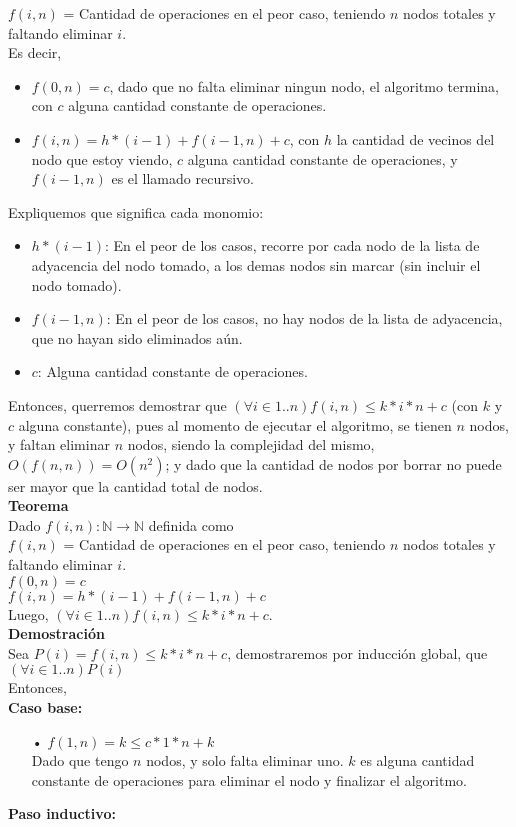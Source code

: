 $f(i,n)$ = Cantidad de operaciones en el peor caso, teniendo $n$ nodos totales y faltando eliminar $i$.\\
Es decir,\par
\begin{itemize}
	\item$f(0,n) = c$, dado que no falta eliminar ningun nodo, el algoritmo termina, con $c$ alguna cantidad constante de operaciones.\par
	\item $f(i,n) = h*(i-1) + f(i-1,n) + c$, con $h$ la cantidad de vecinos del nodo que estoy viendo, $c$ alguna cantidad constante de operaciones, y $f(i-1,n)$ es el llamado recursivo.\\
\end{itemize}
Expliquemos que significa cada monomio:
\begin{itemize}
	\item $h*(i-1)$: En el peor de los casos, recorre por cada nodo de la lista de adyacencia del nodo tomado, a los demas nodos sin marcar (sin incluir el nodo tomado).
	\item $f(i-1,n)$: En el peor de los casos, no hay nodos de la lista de adyacencia, que no hayan sido eliminados aún.
	\item $c$: Alguna cantidad constante de operaciones.
\end{itemize}
Entonces, querremos demostrar que $(\forall i \in {1..n}) f(i,n) \leq k*i*n + c$ (con $k$ y $c$ alguna constante), pues al momento de ejecutar el algoritmo, se tienen $n$ nodos, y faltan eliminar $n$ nodos, siendo la complejidad del mismo, $O(f(n,n)) = O(n^{2})$; y dado que la cantidad de nodos por borrar no puede ser mayor que la cantidad total de nodos.\\

\newpage
{\large\textbf{Teorema}}\\
Dado $f(i,n): \mathbb{N} \rightarrow \mathbb{N}$ definida como\\
$f(i,n)$ = Cantidad de operaciones  en el peor caso, teniendo $n$ nodos totales y faltando eliminar $i$.\\
$f(0,n) = c$\\
$f(i,n) = h*(i-1) + f(i-1,n) + c$\\
Luego, $(\forall i \in {1..n}) f(i,n) \leq k*i*n + c$.\\

{\large\textbf{Demostración}}\\
Sea $P(i) = f(i,n) \leq k*i*n + c$, demostraremos por inducción global, que $(\forall i \in {1..n}) P(i)$\\
Entonces,\\
\textbf{Caso base:}
\begin{itemize}
    \item[•] $f(1,n) = k \leq c*1*n + k$\\
    Dado que tengo $n$ nodos, y solo falta eliminar uno. $k$ es alguna cantidad constante de operaciones para eliminar el nodo y finalizar el algoritmo.
\end{itemize}
\textbf{Paso inductivo:}\\

